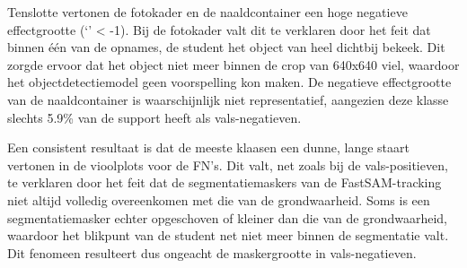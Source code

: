 Tenslotte vertonen de fotokader en de naaldcontainer een hoge negatieve effectgrootte (`' < -1).
Bij de fotokader valt dit te verklaren door het feit dat binnen één van de opnames, de student het object van heel dichtbij bekeek.
Dit zorgde ervoor dat het object niet meer binnen de crop van 640x640 viel, waardoor het objectdetectiemodel geen voorspelling kon maken.
De negatieve effectgrootte van de naaldcontainer is waarschijnlijk niet representatief, aangezien deze klasse slechts 5.9\% van de support heeft als vals-negatieven.

Een consistent resultaat is dat de meeste klaasen een dunne, lange staart vertonen in de vioolplots voor de FN's. 
Dit valt, net zoals bij de vals-positieven, te verklaren door het feit dat de segmentatiemaskers van de FastSAM-tracking niet altijd volledig overeenkomen met die van de grondwaarheid.
Soms is een segmentatiemasker echter opgeschoven of kleiner dan die van de grondwaarheid, waardoor het blikpunt van de student net niet meer binnen de segmentatie valt.
Dit fenomeen resulteert dus ongeacht de maskergrootte in vals-negatieven.

